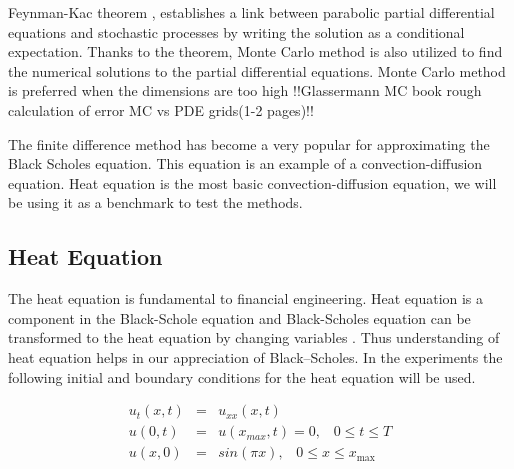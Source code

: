 \documentclass[12pt, oneside]{book}
\theoremstyle{plain}
\theoremstyle{definition}
\begin{document}
Feynman-Kac theorem \cite{klebaner}, establishes a link between parabolic partial differential equations and stochastic processes by writing the solution as a conditional expectation. Thanks to the theorem, Monte Carlo method is also utilized to find the numerical solutions to the partial differential equations.  Monte Carlo method is preferred when the dimensions are too high !!Glassermann MC book rough calculation of error MC vs PDE grids(1-2 pages)!!

The finite difference method has become a very popular for approximating the Black Scholes equation. This equation is an example of a convection-diffusion equation. Heat equation is the most basic convection-diffusion equation, we will be using it as a benchmark to test the methods. 

\subsection{Heat Equation}
The heat equation is fundamental to financial engineering. Heat equation is a component in the Black-Schole equation and Black-Scholes equation can be transformed to the heat equation by changing variables \cite{capinski}. Thus understanding  of  heat equation  helps  in  our appreciation of Black–Scholes. In the experiments the following initial and boundary conditions for the heat equation will be used.


\begin{eqnarray} \label{HeatBase}
u_t(x,t) &=& u_{xx}(x, t) \\[10pt]
u(0, t) &=& u(x_{max}, t) = 0, \hspace{10pt} 0 \leq t \leq T \\[10pt]
u(x, 0) &=& sin(\pi x), \hspace{10pt} 0 \leq x \leq x_{\max}
\end{eqnarray}
\end{document}
